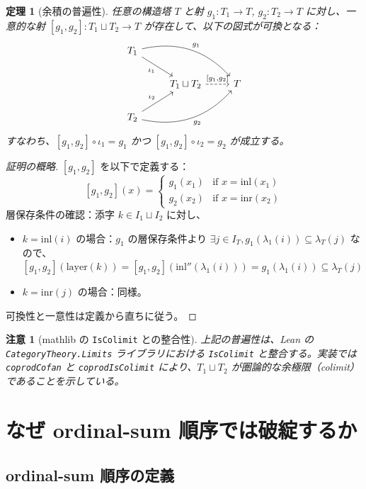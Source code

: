 \documentclass[a4paper,12pt]{ltjsarticle}
\newtheorem{theorem}[definition]{定理}
\newtheorem{remark}[definition]{注意}
\theoremstyle{definition}
\begin{document}
\begin{theorem}[余積の普遍性]
\label{thm:coproduct-universal}
任意の構造塔 $T$ と射 $g_1 : T_1 \to T$, $g_2 : T_2 \to T$ に対し、一意的な射 $[g_1, g_2] : T_1 \sqcup T_2 \to T$ が存在して、以下の図式が可換となる：
\[
\begin{tikzcd}
    T_1 \ar[dr, "\iota_1"'] \ar[drr, bend left, "g_1"] & & \\
    & T_1 \sqcup T_2 \ar[r, dashed, "{[g_1, g_2]}"] & T \\
    T_2 \ar[ur, "\iota_2"] \ar[urr, bend right, "g_2"'] & &
\end{tikzcd}
\]
すなわち、$[g_1, g_2] \circ \iota_1 = g_1$ かつ $[g_1, g_2] \circ \iota_2 = g_2$ が成立する。
\end{theorem}

\begin{proof}[証明の概略]
$[g_1, g_2]$ を以下で定義する：
\[
[g_1, g_2](x) = \begin{cases}
    g_1(x_1) & \text{if } x = \mathrm{inl}(x_1) \\
    g_2(x_2) & \text{if } x = \mathrm{inr}(x_2)
\end{cases}
\]
層保存条件の確認：添字 $k \in I_1 \sqcup I_2$ に対し、
\begin{itemize}
    \item $k = \mathrm{inl}(i)$ の場合：$g_1$ の層保存条件より $\exists j \in I_T, g_1(\lambda_1(i)) \subseteq \lambda_T(j)$ なので、
    \[
    [g_1, g_2](\text{layer}(k)) = [g_1, g_2](\mathrm{inl}''(\lambda_1(i))) = g_1(\lambda_1(i)) \subseteq \lambda_T(j)
    \]
    \item $k = \mathrm{inr}(j)$ の場合：同様。
\end{itemize}
可換性と一意性は定義から直ちに従う。
\end{proof}

\begin{remark}[mathlib の \texttt{IsColimit} との整合性]
上記の普遍性は、Lean の \texttt{CategoryTheory.Limits} ライブラリにおける \texttt{IsColimit} と整合する。実装では \texttt{coprodCofan} と \texttt{coprodIsColimit} により、$T_1 \sqcup T_2$ が圏論的な余極限（colimit）であることを示している。
\end{remark}

\section{なぜ ordinal-sum 順序では破綻するか}
\label{sec:why-fail}

\subsection{ordinal-sum 順序の定義}
\end{document}

